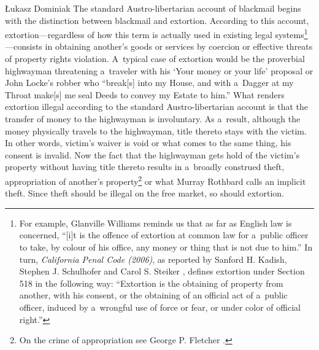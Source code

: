 \begin{artengenv}{Łukasz Dominiak}
The standard Austro-libertarian account of blackmail begins with the distinction between blackmail and extortion. According to this account, extortion---regardless of how this term is actually used in existing legal systems\footnote{For example, Glanville Williams 
\parencite*[][p.838]{williams_textbook_1983} %
 reminds us that as far as English law is concerned, ``[i]t is the offence of extortion at common law for a~public officer to take, by colour of his office, any money or thing that is not due to him.'' In turn, \textit{California Penal Code (2006)}, as reported by Sanford H. Kadish, Stephen J. Schulhofer and Carol S. Steiker 
\parencite*[][p.941]{kadish_criminal_2007}, %
 defines extortion under Section 518 in the following way: ``Extortion is the obtaining of property from another, with his consent, or the obtaining of an official act of a~public officer, induced by a~wrongful use of force or fear, or under color of official right.''}---consists in obtaining another's goods or services by coercion or effective threats of property rights violation. A~typical case of extortion would be the proverbial highwayman threatening a~traveler with his ‘Your money or your life' proposal or John Locke's 
\parencite[p.~385\ \mbox{[1698, II, Chap.~XVI, §176]}]{locke_two_2003}\nocite{locke_two_1689} %
 robber who ``break[s] into my House, and with a~Dagger at my Throat make[s] me seal Deeds to convey my Estate to him.'' What renders extortion illegal according to the standard Austro-libertarian account is that the transfer of money to the highwayman is involuntary. As a~result, although the money physically travels to the highwayman, title thereto stays with the victim. In other words, victim's waiver is void or what comes to the same thing, his consent is invalid. Now the fact that the highwayman gets hold of the victim's property without having title thereto results in a~broadly construed theft, appropriation of another's property\footnote{On the crime of appropriation see George P. Fletcher 
\parencite*[][pp.7–22]{fletcher_rethinking_2000}.%
} or what Murray Rothbard 
\parencite*[][p.77]{rothbard_ethics_1998} %
 calls an implicit theft. Since theft should be illegal on the free market, so should extortion.




\end{artengenv}
